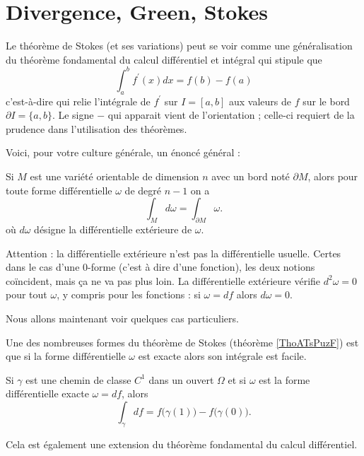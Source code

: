 \section{Divergence, Green, Stokes}

Le théorème de Stokes (et ses variations) peut se voir comme une généralisation du théorème fondamental du calcul différentiel et intégral qui stipule que
\begin{equation*}
	\int_a^b f^\prime(x) d x = f(b) - f(a)
\end{equation*}
c'est-à-dire qui relie l'intégrale de $f^\prime$ sur $I = [a,b]$ aux valeurs de $f$ sur le bord $\partial I = \{a,b\}$. Le signe $-$ qui apparait vient de l'orientation ; celle-ci requiert de la prudence dans l'utilisation des théorèmes.

Voici, pour votre culture générale, un énoncé général :
\begin{theorem} \label{ThoATsPuzF}
	Si $M$ est une variété orientable de dimension $n$ avec un bord noté $\partial  M$, alors pour toute forme différentielle $\omega$ de degré $n-1$ on a 
	\begin{equation*}
		\int_{ M} d \omega = \int_{\partial  M} \omega.
	\end{equation*}
	où $d \omega$ désigne la différentielle extérieure de $\omega$.
\end{theorem}
Attention : la différentielle extérieure n'est pas la différentielle usuelle. Certes dans le cas d'une \( 0\)-forme (c'est à dire d'une fonction), les deux notions coïncident, mais ça ne va pas plus loin. La différentielle extérieure vérifie \( d^2\omega=0\) pour tout \( \omega\), y compris pour les fonctions : si \( \omega=df\) alors \( d\omega=0\).


Nous allons maintenant voir quelques cas particuliers. 

Une des nombreuses formes du théorème de Stokes (théorème \ref{ThoATsPuzF}) est que si la forme différentielle \( \omega\) est exacte alors son intégrale est facile.
\begin{theorem} \label{ThoUJMhFwU}
    Si \( \gamma\) est une chemin de classe \( C^1\) dans un ouvert \( \Omega\) et si \( \omega\) est la forme différentielle exacte \( \omega=df\), alors
    \begin{equation}
        \int_{\gamma}df=f\big( \gamma(1) \big)-f\big( \gamma(0) \big).
    \end{equation}
\end{theorem}
Cela est également une extension du théorème fondamental du calcul différentiel.


